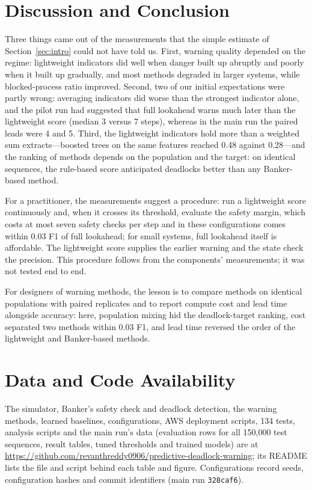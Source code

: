 \documentclass[conference]{IEEEtran}
\begin{document}
\section{Discussion and Conclusion}\label{sec:conclusion}
Three things came out of the measurements that the simple estimate of Section~\ref{sec:intro} could not have told us. First, warning quality depended on the regime: lightweight indicators did well when danger built up abruptly and poorly when it built up gradually, and most methods degraded in larger systems, while blocked-process ratio improved. Second, two of our initial expectations were partly wrong: averaging indicators did worse than the strongest indicator alone, and the pilot run had suggested that full lookahead warns much later than the lightweight score (median 3 versus 7 steps), whereas in the main run the paired leads were 4 and 5. Third, the lightweight indicators hold more than a weighted sum extracts---boosted trees on the same features reached 0.48 against 0.28---and the ranking of methods depends on the population and the target: on identical sequences, the rule-based score anticipated deadlocks better than any Banker-based method.

For a practitioner, the measurements suggest a procedure: run a lightweight score continuously and, when it crosses its threshold, evaluate the safety margin, which costs at most seven safety checks per step and in these configurations comes within 0.03 F1 of full lookahead; for small systems, full lookahead itself is affordable. The lightweight score supplies the earlier warning and the state check the precision. This procedure follows from the components' measurements; it was not tested end to end.

For designers of warning methods, the lesson is to compare methods on identical populations with paired replicates and to report compute cost and lead time alongside accuracy: here, population mixing hid the deadlock-target ranking, cost separated two methods within 0.03 F1, and lead time reversed the order of the lightweight and Banker-based methods.
\section*{Data and Code Availability}
The simulator, Banker's safety check and deadlock detection, the warning methods, learned baselines, configurations, AWS deployment scripts, 134 tests, analysis scripts and the main run's data (evaluation rows for all 150,000 test sequences, result tables, tuned thresholds and trained models) are at \url{https://github.com/revanthreddy0906/predictive-deadlock-warning}; its README lists the file and script behind each table and figure. Configurations record seeds, configuration hashes and commit identifiers (main run \texttt{328caf6}).



\end{document}
